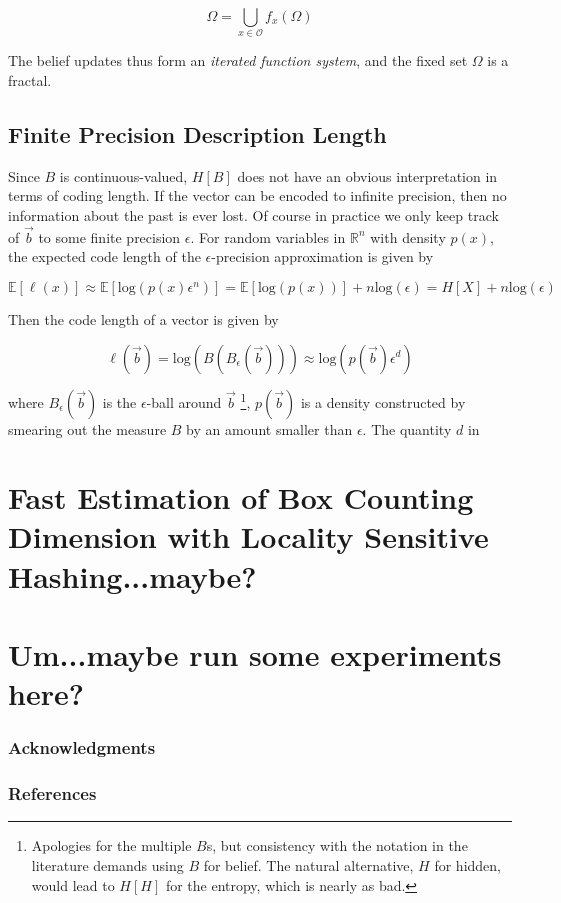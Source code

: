 \documentclass{article} %
\begin{document}
\begin{equation}
\Omega = \bigcup_{x\in\mathcal{O}} f_x(\Omega)
\end{equation}

The belief updates thus form an {\em iterated function system}, and the fixed set $\Omega$ is a fractal.  

\subsection{Finite Precision Description Length}

Since $B$ is continuous-valued, $H[B]$ does not have an obvious interpretation in terms of coding length.  If the vector can be encoded to infinite precision, then no information about the past is ever lost.  Of course in practice we only keep track of $\vec{b}$ to some finite precision $\epsilon$.  For random variables in $\mathbb{R}^n$ with density $p(x)$, the expected code length of the $\epsilon$-precision approximation is given by 

\begin{equation}
\mathbb{E}[\ell(x)] \approx \mathbb{E}[\mathrm{log}(p(x)\epsilon^n)] = \mathbb{E}[\mathrm{log}(p(x))] + n\mathrm{log}(\epsilon) = H[X] + n\mathrm{log}(\epsilon)
\end{equation}

Then the code length of a vector is given by 

\begin{equation}
\ell(\vec{b}) = \mathrm{log}(B(B_\epsilon(\vec{b}))) \approx \mathrm{log}(p(\vec{b})\epsilon^d)
\end{equation}

where $B_\epsilon(\vec{b})$ is the $\epsilon$-ball around $\vec{b}$ \footnote{Apologies for the multiple $B$s, but consistency with the notation in the literature demands using $B$ for belief.  The natural alternative, $H$ for hidden, would lead to $H[H]$ for the entropy, which is nearly as bad.}, $p(\vec{b})$ is a density constructed by smearing out the measure $B$ by an amount smaller than $\epsilon$.  The quantity $d$ in 

\section{Fast Estimation of Box Counting Dimension with Locality Sensitive Hashing...maybe?}

\section{Um...maybe run some experiments here?}

\subsubsection*{Acknowledgments}


\subsubsection*{References}

\small{

}
\end{document}
